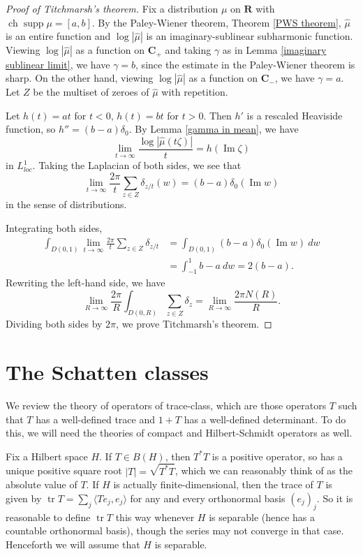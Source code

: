 \documentclass[12pt]{report}
\newcommand{\RR}{\mathbf{R}}
\newcommand{\CC}{\mathbf{C}}
\DeclareMathOperator{\ch}{ch}
\DeclareMathOperator{\supp}{supp}
\newcommand{\tr}{\operatorname{tr}}
\renewcommand{\Im}{\operatorname{Im}}
\theoremstyle{definition}
\begin{document}
\begin{proof}[Proof of Titchmarsh's theorem]
Fix a distribution $\mu$ on $\RR$ with $\ch \supp \mu = [a, b]$. By the Paley-Wiener theorem, Theorem \ref{PWS theorem}, $\hat \mu$ is an entire function and $\log |\hat \mu|$ is an imaginary-sublinear subharmonic function. Viewing $\log |\hat \mu|$ as a function on $\CC_+$ and taking $\gamma$ as in Lemma \ref{imaginary sublinear limit}, we have $\gamma = b$, since the estimate in the Paley-Wiener theorem is sharp. On the other hand, viewing $\log |\hat \mu|$ as a function on $\CC_-$, we have $\gamma = a$. Let $Z$ be the multiset of zeroes of $\hat \mu$ with repetition.

Let $h(t) = at$ for $t < 0$, $h(t) = bt$ for $t > 0$. Then $h'$ is a rescaled Heaviside function, so $h'' = (b-a)\delta_0$. By Lemma \ref{gamma in mean}, we have
$$\lim_{t \to \infty} \frac{\log |\hat \mu(t\zeta)|}{t} = h(\Im \zeta)$$
in $L^1_{loc}$. Taking the Laplacian of both sides, we see that
$$\lim_{t \to \infty} \frac{2\pi}{t} \sum_{z \in Z} \delta_{z/t}(w) = (b-a)\delta_0(\Im w)$$
in the sense of distributions.

Integrating both sides,
\begin{align*}
\int_{D(0, 1)} \lim_{t \to \infty} \frac{2\pi}{t} \sum_{z \in Z} \delta_{z/t} &= \int_{D(0, 1)} (b-a)\delta_0(\Im w) ~dw \\
&= \int_{-1}^1 b - a ~dw = 2(b - a).\end{align*}
Rewriting the left-hand side, we have
$$\lim_{R \to \infty} \frac{2\pi }{R} \int_{D(0, R)} \sum_{z \in Z} \delta_z = \lim_{R \to \infty} \frac{2\pi N(R)}{R}.$$
Dividing both sides by $2\pi$, we prove Titchmarsh's theorem.
\end{proof}

\section{The Schatten classes}
\label{noncommutative sequence space section}
We review the theory of operators of trace-class, which are those operators $T$ such that $T$ has a well-defined trace and $1 + T$ has a well-defined determinant. To do this, we will need the theories of compact and Hilbert-Schmidt operators as well.

Fix a Hilbert space $H$. If $T \in B(H)$, then $T^*T$ is a positive operator, so has a unique positive square root $|T| = \sqrt{T^*T}$, which we can reasonably think of as the absolute value of $T$. If $H$ is actually finite-dimensional, then the trace of $T$ is given by $\tr T = \sum_j \langle Te_j, e_j\rangle$ for any and every orthonormal basis $(e_j)_j$. So it is reasonable to define $\tr T$ this way whenever $H$ is separable (hence has a countable orthonormal basis), though the series may not converge in that case. Henceforth we will assume that $H$ is separable.
\end{document}
